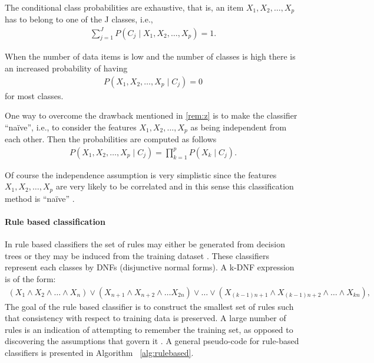\begin{remark}
The conditional class probabilities are exhaustive, that is, an item $X_{1} , X_{2} , \dots , X_{p}$ has to belong to one of the J classes, i.e., 
\begin{align}
\sum_{j=1}^{J}P(C_{j} \mid X_{1},X_{2}, \dots , X_{p}) = 1.
\end{align}
\end{remark}

\begin{remark}
\label{rem:z}
When the number of data items is low and the number of classes is high there is an increased probability of having
\begin{align}
P( X_{1} , X_{2} , \dots, X_{p} \mid C_{j} ) = 0
\end{align}
for most classes.
\end{remark}

One way to overcome the drawback mentioned in \ref{rem:z} is to make the classifier ``na\"{i}ve'', i.e., to consider the features $X_{1} , X_{2} , \dots , X_{p}$  as being independent from each other. 
Then the probabilities are computed as follows
\begin{align}
P( X_{1} , X_{2} ,\dots, X_{p} \mid C_{j} ) = \prod_{k=1}^{p} P( X_k{} \mid C_{j} ).
\end{align}

Of course the independence assumption is very simplistic since the features $X_{1} , X_{2} , \dots , X_{p}$ are very likely to be correlated and in this sense this classification method is ``na\"{i}ve'' \cite{Ben08Encyclopedia}. 


\paragraph{Rule based classification}

In rule based classifiers the set of rules may either be generated from decision trees or they may be induced from the training dataset \cite{Han06DataMining}. These classifiers represent each classes by DNFs (disjunctive normal forms). A k-DNF expression is of the form: 
\begin{align}
(X_{1} \wedge X_{2} \wedge \dots \wedge X_{n}) \vee (X_{n+1} \wedge X_{n+2} \wedge \dots X_{2n}) \vee \dots \vee (X_{(k-1)n+1} \wedge X_{(k-1)n+2} \wedge \dots \wedge X_{kn}) , 
\end{align}
The goal of the rule based classifier is to construct the smallest set of rules such that consistency with respect to training data is preserved. A large number of rules is an indication of attempting to remember the training set, as opposed to discovering the assumptions that govern it \cite{Kotsiantis07Supervised}. A general pseudo-code for rule-based classifiers is presented in Algorithm ~\ref{alg:rulebased}.

